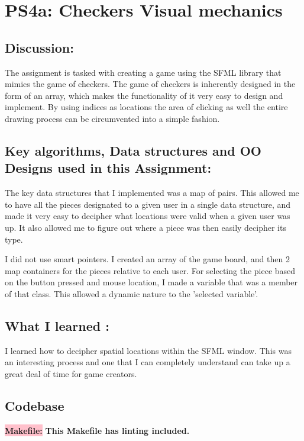 \section{PS4a: Checkers Visual mechanics}\label{sec:ps4a}
\graphicspath{{ps4a}}
\subsection{Discussion:}\label{sec:ps4a:disc}
The assignment is tasked with creating a game using the SFML library that mimics the game of checkers. The game of checkers
is inherently designed in the form of an array, which makes the functionality of it very easy to design and implement. By using indices as locations the area of clicking as well the entire drawing process can be circumvented into a simple fashion. 

\subsection{Key algorithms, Data structures and OO Designs used in this Assignment:}
The key data structures that I implemented was a map of pairs. This allowed me to have all the pieces designated to a given user in a single data structure, and made it very easy to decipher what locations were valid 
when a given user was up. It also allowed me to figure out where a piece was then easily decipher its type. 

I did not use smart pointers. I created an array of the game board, and then 2 map containers for the pieces relative to each user. For selecting the piece based on the button pressed and mouse location, I made a variable that was a member of that class.
This allowed a dynamic nature to the 'selected variable'. 
\subsection{What I learned :}
I learned how to decipher spatial locations within the SFML window. This was an interesting process and one that I can completely understand can take up a great deal of time for game creators. 
\subsection{Codebase}\label{sec:ps4a:code}

\textbf{\colorbox{pink}{Makefile:}} \newline \textbf{This Makefile has linting included.}



